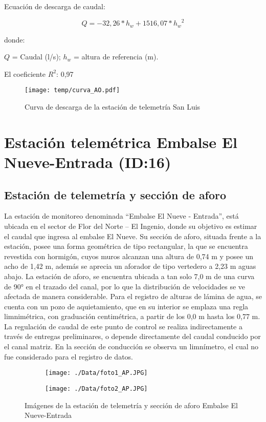\documentclass[]{article}
\begin{document}
Ecuación de descarga de caudal:

\[Q = -32,26* h_w + 1516,07*{{h_w}^2}\]

donde:

\(Q\) = Caudal (l/s); \(h_w\) = altura de referencia (m).

El coeficiente \(R^2\): 0,97

\begin{figure}[H]
  \centering
  \texttt{[image: temp/curva\_AO.pdf]}
\caption{Curva de descarga de la estación de telemetría San Luis}
\label{fig:Curva_AO}
\end{figure}

\clearpage
\section{Estación telemétrica Embalse El Nueve-Entrada (ID:16)}

\subsection{Estación de telemetría y sección de aforo}

La estación de monitoreo denominada ``Embalse El Nueve - Entrada'', está ubicada en el sector de Flor del Norte – El Ingenio, donde su objetivo es estimar el caudal que ingresa al embalse El Nueve. Su sección de aforo, situada frente a la estación, posee una forma geométrica de tipo rectangular, la que se encuentra revestida con hormigón, cuyos muros alcanzan una altura de 0,74 m y posee un acho de 1,42 m, además se aprecia un aforador de tipo vertedero a 2,23 m aguas abajo. La estación de aforo, se encuentra ubicada a tan solo 7,0 m de una curva de 90° en el trazado del canal, por lo que la distribución de velocidades se ve afectada de manera considerable. Para el registro de alturas de lámina de agua, se cuenta con un pozo de aquietamiento, que en su interior se emplaza una regla limnimétrica, con graduación centimétrica, a partir de los 0,0 m hasta los 0,77 m. La regulación de caudal de este punto de control se realiza indirectamente a través de entregas preliminares, o depende directamente del caudal conducido por el canal matriz. En la sección de conducción se observa un limnímetro, el cual no fue considerado para el registro de datos.

\begin{figure}[H]
  \centering
\begin{subfigure}{.49\textwidth}
  \texttt{[image: ./Data/foto1\_AP.JPG]}
\end{subfigure}
\hfill
\begin{subfigure}{.49\textwidth}
  \texttt{[image: ./Data/foto2\_AP.JPG]}
\end{subfigure}
\caption{Imágenes de la estación de telemetría y sección de aforo Embalse El Nueve-Entrada}
\label{fig:fotos_16}
\end{figure}
\end{document}
